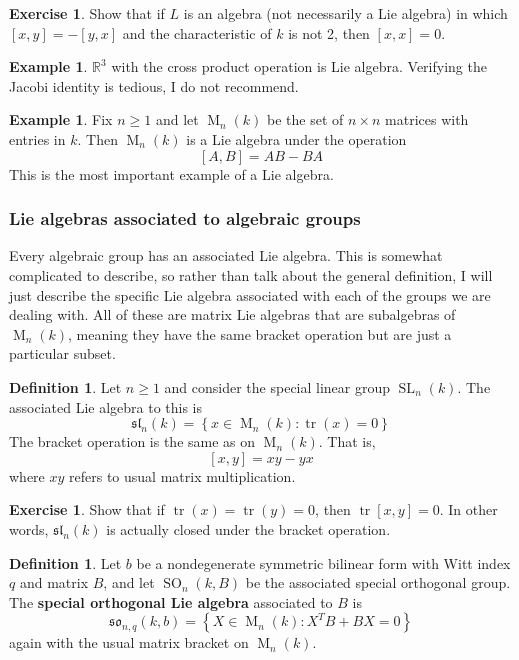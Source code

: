 \documentclass[12pt]{article}
\theoremstyle{definition}
\newtheorem{definition}[theorem]{Definition}
\newtheorem{example}[theorem]{Example}
\newtheorem{exercise}[theorem]{Exercise}
\numberwithin{theorem}{subsection}
\newcommand{\R}{\mathbb{R}}
\newcommand{\lb}{\left\{}
\newcommand{\rb}{\right\}}
\newcommand{\tbf}{\textbf}
\DeclareMathOperator{\M}{M}
\DeclareMathOperator{\SL}{SL}
\DeclareMathOperator{\SO}{SO}
\DeclareMathOperator{\tr}{tr}
\begin{document}
\begin{exercise}
Show that if $L$ is an algebra (not necessarily a Lie algebra) in which $[x,y] = -[y,x]$ and the characteristic of $k$ is not 2, then $[x,x] = 0$.
\end{exercise}

\begin{example}
$\R^3$ with the cross product operation is Lie algebra. Verifying the Jacobi identity is tedious, I do not recommend.
\end{example}

\begin{example}
Fix $n \ge 1$ and let $\M_n(k)$ be the set of $n \times n$ matrices with entries in $k$. Then $\M_n(k)$ is a Lie algebra under the operation
\[
	[A,B] = AB - BA
\]
This is the most important example of a Lie algebra.
\end{example}

\subsubsection{Lie algebras associated to algebraic groups}

Every algebraic group has an associated Lie algebra. This is somewhat complicated to describe, so rather than talk about the general definition, I will just describe the specific Lie algebra associated with each of the groups we are dealing with. All of these are matrix Lie algebras that are subalgebras of $\M_n(k)$, meaning they have the same bracket operation but are just a particular subset.

\begin{definition}
Let $n \ge 1$ and consider the special linear group $\SL_n(k)$. The associated Lie algebra to this is
\[
	\mathfrak{sl}_n(k) = \lb x \in \M_n(k) : \tr(x) = 0 \rb
\]
The bracket operation is the same as on $\M_n(k)$. That is,
\[
	[x,y] = xy - yx
\]
where $xy$ refers to usual matrix multiplication.
\end{definition}

\begin{exercise}
Show that if $\tr(x) = \tr(y) = 0$, then $\tr[x,y] = 0$. In other words, $\mathfrak{sl}_n(k)$ is actually closed under the bracket operation.
\end{exercise}

\begin{definition}
Let $b$ be a nondegenerate symmetric bilinear form with Witt index $q$ and matrix $B$, and let $\SO_{n}(k,B)$ be the associated special orthogonal group. The \tbf{special orthogonal Lie algebra} associated to $B$ is
\[
	\mathfrak{so}_{n,q}(k,b) = \lb X \in \M_n(k) : X^TB + BX = 0 \rb
\]
again with the usual matrix bracket on $\M_n(k)$.
\end{definition}
\end{document}
